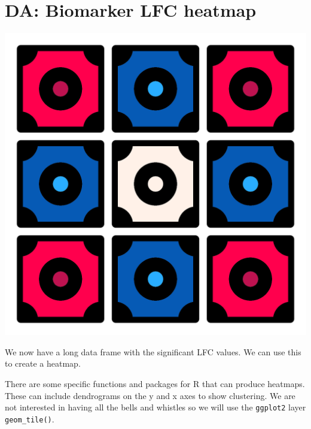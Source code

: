 \documentclass[
]{book}
\begin{document}
\hypertarget{da-biomarker-lfc-heatmap}{%
\section{DA: Biomarker LFC heatmap}\label{da-biomarker-lfc-heatmap}}

\includegraphics{figures/tiles.png}

We now have a long data frame with the significant LFC values.
We can use this to create a heatmap.

There are some specific functions and packages for R that can produce heatmaps.
These can include dendrograms on the y and x axes to show clustering.
We are not interested in having all the bells and whistles so we will use the \texttt{ggplot2} layer \texttt{geom\_tile()}.
\end{document}
